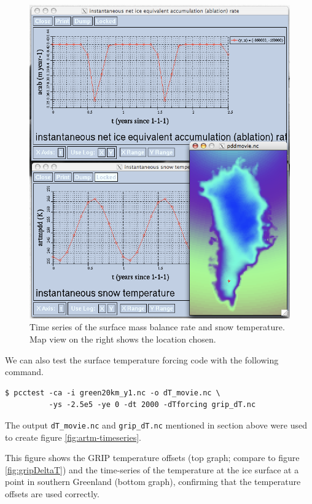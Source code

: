 \documentclass[11pt,final]{amsart}
\begin{document}
\begin{figure}[ht]
  \centering
  \includegraphics[width=5in]{pdd_timeseries}
  \caption{Time series of the surface mass balance rate and snow temperature. Map view 
           on the right shows the location chosen.}
  \label{fig:pddseries}
\end{figure}

\bigskip
We can also test the surface temperature forcing code with the following command.
\begin{verbatim}
$ pcctest -ca -i green20km_y1.nc -o dT_movie.nc \
          -ys -2.5e5 -ye 0 -dt 2000 -dTforcing grip_dT.nc
\end{verbatim}
The output \verb|dT_movie.nc| and \verb|grip_dT.nc| mentioned in section above were used to create figure \ref{fig:artm-timeseries}.

This figure shows the GRIP temperature offsets (top graph; compare to figure \ref{fig:gripDeltaT}) and the time-series of the temperature at the ice surface at a point in southern Greenland (bottom graph), confirming that the temperature offsets are used correctly.
\end{document}
